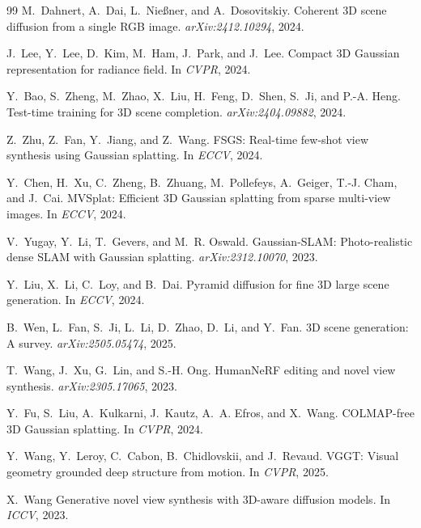 \begin{thebibliography}{99}
M.~Dahnert, A.~Dai, L.~Nießner, and A.~Dosovitskiy.
Coherent 3{D} scene diffusion from a single {RGB} image.
\emph{arXiv:2412.10294}, 2024.

J.~Lee, Y.~Lee, D.~Kim, M.~Ham, J.~Park, and J.~Lee.
Compact 3{D} {Gaussian} representation for radiance field.
In \emph{CVPR}, 2024.

Y.~Bao, S.~Zheng, M.~Zhao, X.~Liu, H.~Feng, D.~Shen, S.~Ji, and P.-A. Heng.
Test-time training for 3{D} scene completion.
\emph{arXiv:2404.09882}, 2024.

Z.~Zhu, Z.~Fan, Y.~Jiang, and Z.~Wang.
{FSGS}: Real-time few-shot view synthesis using Gaussian splatting.
In \emph{ECCV}, 2024.

Y.~Chen, H.~Xu, C.~Zheng, B.~Zhuang, M.~Pollefeys, A.~Geiger, T.-J. Cham, and J.~Cai.
{MVSplat}: Efficient 3{D} Gaussian splatting from sparse multi-view images.
In \emph{ECCV}, 2024.

V.~Yugay, Y.~Li, T.~Gevers, and M.~R. Oswald.
{Gaussian-SLAM}: Photo-realistic dense {SLAM} with Gaussian splatting.
\emph{arXiv:2312.10070}, 2023.

Y.~Liu, X.~Li, C.~Loy, and B.~Dai.
Pyramid diffusion for fine 3{D} large scene generation.
In \emph{ECCV}, 2024.

B.~Wen, L.~Fan, S.~Ji, L.~Li, D.~Zhao, D.~Li, and Y.~Fan.
3{D} scene generation: A survey.
\emph{arXiv:2505.05474}, 2025.

T.~Wang, J.~Xu, G.~Lin, and S.-H. Ong.
{HumanNeRF} editing and novel view synthesis.
\emph{arXiv:2305.17065}, 2023.

Y.~Fu, S.~Liu, A.~Kulkarni, J.~Kautz, A.~A. Efros, and X.~Wang.
{COLMAP}-free 3{D} Gaussian splatting.
In \emph{CVPR}, 2024.

Y.~Wang, Y.~Leroy, C.~Cabon, B.~Chidlovskii, and J.~Revaud.
{VGGT}: Visual geometry grounded deep structure from motion.
In \emph{CVPR}, 2025.

X.~Wang \etal
Generative novel view synthesis with 3{D}-aware diffusion models.
In \emph{ICCV}, 2023.


\end{thebibliography}
